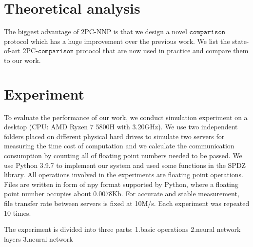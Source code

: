 \documentclass[letterpaper]{article} %
\begin{document}
    \section{Theoretical analysis}
    The biggest advantage of 2PC-NNP is that we design a novel $\mathtt{comparison}$ protocol which has
    a huge improvement over the previous work.
    We list the state-of-art 2PC-$\mathtt{comparison}$ protocol that are now used in practice and compare them to our work.

    \begin{table}[!ht]

        \center

        \caption{Experiment II-Layers consumption}
        \label{Overhead of methods}
    \end{table}


    \section{Experiment}
    To evaluate the performance of our work, we conduct simulation experiment on a desktop (CPU: AMD Ryzen 7 5800H with 3.20GHz).
    We use two independent folders placed on different physical hard drives to simulate
    two servers for measuring the time cost of computation
    and we calculate the communication consumption by counting all of floating point numbers needed to be passed.
    We use Python 3.9.7 to implement our system and used some functions in the SPDZ library.%
    All operations involved in the experiments are floating point operations.
    Files are written in form of npy format supported by Python, where a floating point number occupies about 0.0078Kb.
    For accurate and stable measurement, file transfer rate between servers is fixed at 10M/s.
    Each experiment was repeated 10 times.

    The experiment is divided into three parts: 1.basic operations 2.neural network layers 3.neural network
\end{document}
